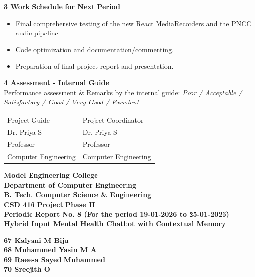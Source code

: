\documentclass[12pt,a4paper]{article}
\begin{document}
\noindent\textbf{3 \quad Work Schedule for Next Period}
\begin{itemize}
    \item Final comprehensive testing of the new React MediaRecorders and the PNCC audio pipeline.
    \item Code optimization and documentation/commenting.
    \item Preparation of final project report and presentation.
\end{itemize}


\noindent\textbf{4 \quad Assessment - Internal Guide}\\[0.5em]
Performance assessment \& Remarks by the internal guide: \textit{Poor / Acceptable /}\\
\textit{Satisfactory / Good / Very Good / Excellent}\\[3em]

\noindent
\begin{tabular}{p{} p{}}
Project Guide & Project Coordinator\\[0.5em]
Dr. Priya S & Dr. Priya S\\
Professor & Professor\\
Computer Engineering & Computer Engineering\\
\end{tabular}

\vfill
\newpage


\begin{center}
{\Large \textbf{Model Engineering College}}\\[0.2em]
{\large \textbf{Department of Computer Engineering}}\\[0.2em]
{\large \textbf{B. Tech. Computer Science \& Engineering}}\\[0.2em]
{\large \textbf{CSD 416 Project Phase II}}\\[1em]
{\large \textbf{Periodic Report No. 8 (For the period 19-01-2026 to 25-01-2026)}}\\[1.5em]

{\Large \textbf{Hybrid Input Mental Health Chatbot with Contextual Memory}}\\[0.2em]

\end{center}

\begin{center}
\textbf{67  Kalyani M Biju\\
68 Muhammed Yasin M A\\
69 Raeesa Sayed Muhammed\\
70 Sreejith O\\[1.5em]}
\end{center}
\end{document}
